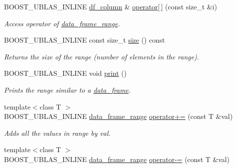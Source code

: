 \begin{DoxyCompactItemize}
B\+O\+O\+S\+T\+\_\+\+U\+B\+L\+A\+S\+\_\+\+I\+N\+L\+I\+NE \hyperlink{classboost_1_1numeric_1_1ublas_1_1df__column}{df\+\_\+column} \& \hyperlink{classboost_1_1numeric_1_1ublas_1_1data__frame__range_aea4194a8602095f16e62b63dd0e16add}{operator\mbox{[}$\,$\mbox{]}} (const size\+\_\+t \&i)
\begin{DoxyCompactList}\small\item\em Access operator of \hyperlink{classboost_1_1numeric_1_1ublas_1_1data__frame__range}{data\+\_\+frame\+\_\+range}. \end{DoxyCompactList}\item 
B\+O\+O\+S\+T\+\_\+\+U\+B\+L\+A\+S\+\_\+\+I\+N\+L\+I\+NE const size\+\_\+t \hyperlink{classboost_1_1numeric_1_1ublas_1_1data__frame__range_a1d6a04f53085abfe97395901c68092c0}{size} () const 
\begin{DoxyCompactList}\small\item\em Returns the size of the range (number of elements in the range). \end{DoxyCompactList}\item 
B\+O\+O\+S\+T\+\_\+\+U\+B\+L\+A\+S\+\_\+\+I\+N\+L\+I\+NE void \hyperlink{classboost_1_1numeric_1_1ublas_1_1data__frame__range_a95ac1980061a57cfb0929fb6bb96105d}{print} ()
\begin{DoxyCompactList}\small\item\em Prints the range similar to a \hyperlink{classboost_1_1numeric_1_1ublas_1_1data__frame}{data\+\_\+frame}. \end{DoxyCompactList}\item 
{\footnotesize template$<$class T $>$ }\\B\+O\+O\+S\+T\+\_\+\+U\+B\+L\+A\+S\+\_\+\+I\+N\+L\+I\+NE \hyperlink{classboost_1_1numeric_1_1ublas_1_1data__frame__range}{data\+\_\+frame\+\_\+range} \hyperlink{classboost_1_1numeric_1_1ublas_1_1data__frame__range_a0dfa1f7faa8e35cad88c2d18066e2598}{operator+=} (const T \&val)
\begin{DoxyCompactList}\small\item\em Adds all the values in range by {\ttfamily val}. \end{DoxyCompactList}\item 
{\footnotesize template$<$class T $>$ }\\B\+O\+O\+S\+T\+\_\+\+U\+B\+L\+A\+S\+\_\+\+I\+N\+L\+I\+NE \hyperlink{classboost_1_1numeric_1_1ublas_1_1data__frame__range}{data\+\_\+frame\+\_\+range} \hyperlink{classboost_1_1numeric_1_1ublas_1_1data__frame__range_a44dbe4be517debab0f4a5378a76b8b0c}{operator-\/=} (const T \&val)

\end{DoxyCompactItemize}
